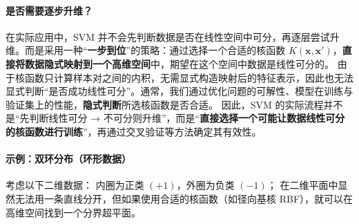 \paragraph*{是否需要逐步升维？}
在实际应用中，SVM 并不会先判断数据是否在线性空间中可分，再逐层尝试升维。而是采用一种“\textbf{一步到位}”的策略：通过选择一个合适的核函数 \(K(\mathbf{x}, \mathbf{x}')\)，\textbf{直接将数据隐式映射到一个高维空间}中，期望在这个空间中数据是线性可分的。
由于核函数只计算样本对之间的内积，无需显式构造映射后的特征表示，因此也无法显式判断“是否成功线性可分”。通常，我们通过优化问题的可解性、模型在训练与验证集上的性能，\textbf{隐式判断}所选核函数是否合适。
因此，SVM 的实际流程并不是“先判断线性可分 → 不可分则升维”，而是“\textbf{直接选择一个可能让数据线性可分的核函数进行训练}”，再通过交叉验证等方法确定其有效性。
\paragraph{示例：双环分布（环形数据）}
考虑以下二维数据：
内圈为正类 $(+1)$，外圈为负类 $(-1)$；
在二维平面中显然无法用一条直线分开，但如果使用合适的核函数（如径向基核 RBF），就可以在高维空间找到一个分界超平面。
